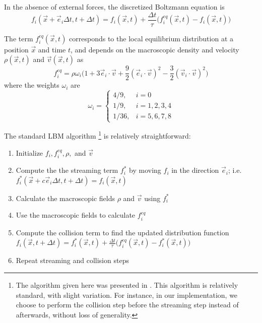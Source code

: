 \documentclass[a4paper]{article}
\begin{document}
In the absence of external forces, the discretized Boltzmann equation is 
 \begin{equation}
     f_i(\vec{x} + \vec{e}_i\Delta t, t + \Delta t) = f_i(\vec{x}, t) + \frac{\Delta t}{\tau}\Big(f_i^{eq}(\vec{x}, t) - f_i(\vec{x}, t)\Big) 
 \end{equation}
 
The term $f_i^{eq}(\vec{x}, t)$ corresponds to the local equilibrium distribution at a position $\vec{x}$ and time $t$, and depends on the macroscopic density and velocity $\rho(\vec{x}, t)$ and $\vec{v}(\vec{x}, t)$ as
\begin{equation}
    f_i^{eq} = \rho\omega_i\Big(1 + 3\vec{e}_i\cdot\vec{v} + \frac{9}{2}(\vec{e}_i\cdot\vec{v})^2 - \frac{3}{2}(\vec{v}_i\cdot\vec{v})^2\Big)
\end{equation}
where the weights $\omega_i$ are 
\begin{equation}
    \omega_i = \left\{\begin{array}{cl}
        4/9, & i = 0 \\
        1/9, & i = 1, 2, 3, 4 \\
         1/36, & i = 5, 6, 7, 8
    \end{array}\right.
\end{equation}

The standard LBM algorithm \footnote{The algorithm given here was presented in \cite{meskas}. This algorithm is relatively standard, with slight variation. For instance, in our implementation, we choose to perform the collision step before the streaming step instead of afterwards, without loss of generality.} is relatively straightforward: 

\begin{enumerate}
    \item Initialize $f_i, f_i^{eq}, \rho,$ and $\vec{v}$ 
    \item Compute the the streaming term $f_i^*$ by moving $f_i$ in the direction $\vec{e}_i$; i.e. $f_i^*(\vec{x} + c\vec{e}_i\Delta t, t + \Delta t) = f_i(\vec{x}, t)$ 
    \item Calculate the macroscopic fields $\rho$ and $\vec{v}$ using $f_i^*$  
    \item Use the macroscopic fields to calculate $f_i^{eq}$
    \item Compute the collision term to find the updated distribution function $f_i(\vec{x}, t + \Delta t) = f_i^*(\vec{x}, t) + \frac{\Delta t}{\tau}\big(f_i^{eq}(\vec{x}, t) - f_i^*(\vec{x}, t)\big)$
    \item Repeat streaming and collision steps 
\end{enumerate}
\end{document}
